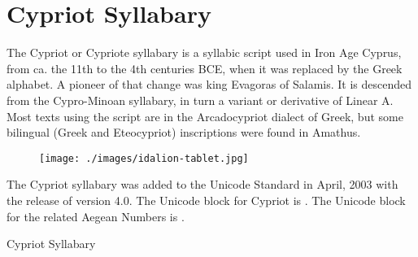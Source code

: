 \section{Cypriot Syllabary}
\label{s:cypriot}
The Cypriot or Cypriote syllabary is a syllabic script used in Iron Age Cyprus, from ca. the 11th to the 4th centuries BCE, when it was replaced by the Greek alphabet. A pioneer of that change was king Evagoras of Salamis. It is descended from the Cypro-Minoan syllabary, in turn a variant or derivative of Linear A. Most texts using the script are in the Arcadocypriot dialect of Greek, but some bilingual (Greek and Eteocypriot) inscriptions were found in Amathus.

\begin{figure}[htb]
\centering
\begin{minipage}{7cm}
\texttt{[image: ./images/idalion-tablet.jpg]}
\end{minipage}\hspace{1.5em}
\begin{minipage}{6cm}
\end{minipage}
\end{figure}

The Cypriot syllabary was added to the Unicode Standard in April, 2003 with the release of version 4.0.
The Unicode block for Cypriot is . The Unicode block for the related Aegean Numbers is .

\newfontfamily{}

\begin{scriptexample}[]{Cypriot Syllabary}

\cypriote {}
\end{scriptexample}


